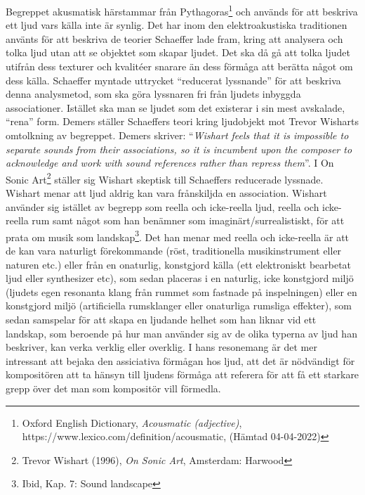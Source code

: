\documentclass{article}
\begin{document}
Begreppet akusmatisk härstammar från Pythagoras\footnote{Oxford English Dictionary, \emph{Acousmatic (adjective)}, https://www.lexico.com/definition/acousmatic, (Hämtad 04-04-2022)} och används för att beskriva
ett ljud vars källa inte är synlig. Det har inom den elektroakustiska traditionen använts för att beskriva de
teorier Schaeffer lade fram, kring att analysera och tolka ljud utan att se objektet som skapar ljudet.
Det ska då gå att tolka ljudet utifrån dess texturer och kvalitéer snarare än dess förmåga att berätta något om dess
källa. Schaeffer myntade uttrycket ``reducerat lyssnande'' för att beskriva denna analysmetod, som ska göra
lyssnaren fri från ljudets inbyggda associationer. Istället ska man se ljudet som det existerar i sin mest
avskalade, ``rena'' form. Demers ställer Schaeffers teori kring ljudobjekt mot Trevor Wisharts omtolkning av
begreppet. Demers skriver: ``\emph{Wishart feels that it is impossible to separate sounds from their
associations, so it is incumbent upon the composer to acknowledge and work with sound references rather than
repress them}''. I On Sonic Art\footnote{Trevor Wishart (1996), \emph{On Sonic Art}, Amsterdam:
Harwood} ställer sig Wishart skeptisk till Schaeffers reducerade lyssnade. Wishart menar att ljud aldrig kan
vara frånskiljda en association.
Wishart använder sig istället av begrepp som reella och
icke-reella ljud, reella och icke-reella rum samt något som han benämner som imaginärt/surrealistiskt, för att
prata om musik som landskap\footnote{Ibid, Kap. 7: Sound landscape}. Det han menar med reella och icke-reella
är att de kan vara naturligt förekommande (röst, traditionella musikinstrument eller naturen etc.) eller från
en onaturlig, konstgjord källa (ett elektroniskt bearbetat ljud eller synthesizer etc), som sedan placeras i
en naturlig, icke konstgjord miljö (ljudets egen resonanta klang från rummet som fastnade på inspelningen)
eller en konstgjord miljö (artificiella rumsklanger eller onaturliga rumsliga effekter), som sedan samspelar
för att skapa en ljudande helhet som han liknar vid ett landskap, som beroende på hur man använder sig av de
olika typerna av ljud han beskriver, kan verka verklig eller overklig. I hans resonemang är det mer intressant
att bejaka den assiciativa förmågan hos ljud, att det är nödvändigt för kompositören att ta hänsyn till ljudens förmåga att referera för att få ett starkare grepp över det man som kompositör vill
förmedla. 
\end{document}
